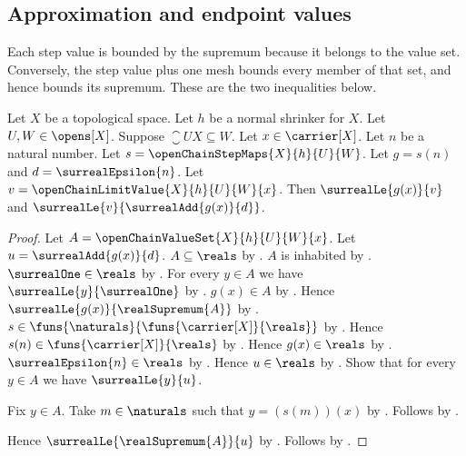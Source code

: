 \subsection{Approximation and endpoint values}

Each step value is bounded by the supremum because it belongs to the value
set. Conversely, the step value plus one mesh bounds every member of that
set, and hence bounds its supremum. These are the two inequalities below.

\begin{theorem}\label{open_chain_limit_value_approximation}
    Let $X$ be a topological space.
    Let $h$ be a normal shrinker for $X$.
    Let $U,W\in\opens[X]$.
    Suppose $\closure{U}{X}\subseteq W$.
    Let $x\in\carrier[X]$.
    Let $n$ be a natural number.
    Let $s=\openChainStepMaps{X}{h}{U}{W}$.
    Let $g=s(n)$ and $d=\surrealEpsilon{n}$.
    Let $v=\openChainLimitValue{X}{h}{U}{W}{x}$.
    Then $\surrealLe{g(x)}{v}$ and
        $\surrealLe{v}{\surrealAdd{g(x)}{d}}$.
\end{theorem}
\begin{proof}
    Let $A=\openChainValueSet{X}{h}{U}{W}{x}$.
    Let $u=\surrealAdd{g(x)}{d}$.
    $A\subseteq\reals$ by .
    $A$ is inhabited by .
    $\surrealOne\in\reals$ by .
    For every $y\in A$ we have $\surrealLe{y}{\surrealOne}$
        by .
    $g(x)\in A$ by .
    Hence $\surrealLe{g(x)}{\realSupremum{A}}$
        by .
    $s\in\funs{\naturals}{\funs{\carrier[X]}{\reals}}$
        by .
    Hence $s(n)\in\funs{\carrier[X]}{\reals}$
        by .
    Hence $g(x)\in\reals$ by .
    $\surrealEpsilon{n}\in\reals$ by .
    Hence $u\in\reals$ by .
    Show that for every $y\in A$ we have $\surrealLe{y}{u}$.
    \begin{subproof}
        Fix $y\in A$.
        Take $m\in\naturals$ such that
            $y=(s(m))(x)$
            by .
        Follows by .
    \end{subproof}
    Hence $\surrealLe{\realSupremum{A}}{u}$
        by .
    Follows by .
\end{proof}

